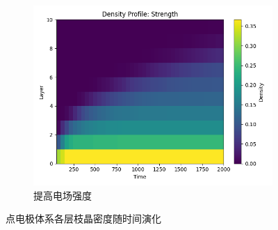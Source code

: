 \documentclass{article}
\begin{document}
\begin{figure}[H]
\begin{subfigure}[b]{0.19\textwidth}
     \end{subfigure}
     \hfill
     \begin{subfigure}[b]{0.19\textwidth}
         \centering
         \includegraphics[scale=0.2]{figs/point_density_profile_strength.png}
         \caption{提高电场强度}
        
     \end{subfigure}
     \caption{点电极体系各层枝晶密度随时间演化}
 
 \end{figure}
 
\end{document}
